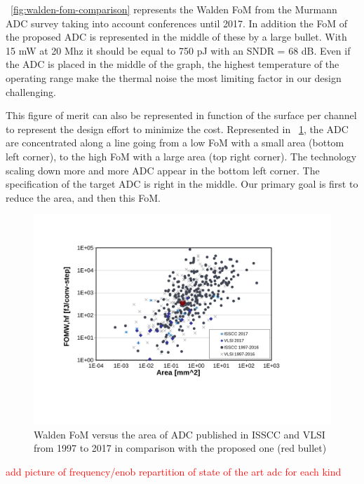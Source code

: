 \figurename~\ref{fig:walden-fom-comparison} represents the Walden FoM from the Murmann ADC survey taking into account conferences until 2017. In addition the FoM of the proposed ADC is represented in the middle of these by a large bullet. With 15 mW at 20 Mhz it should be equal to 750 pJ with an SNDR = 68 dB. Even if the ADC is placed in the middle of the graph, the highest temperature of the operating range make the thermal noise the most limiting factor in our design challenging.

This figure of merit can also be represented in function of the surface per channel to represent the design effort to minimize the cost. Represented in \figurename~\ref{fig:walden-area-fom-comparison}, the ADC are concentrated along a line going from a low FoM with a small area (bottom left corner), to the high FoM with a large area (top right corner). The technology scaling down more and more ADC appear in the bottom left corner. The specification of the target ADC is right in the middle. Our primary goal is first to reduce the area, and then this FoM.

\begin{figure}[htp]
    \centering
    \includegraphics[trim={2cm 3.5cm 3.5cm 2.5cm},clip,width=.8\textwidth]{Chapter1/Figs/walden-area.pdf}
    \caption{Walden FoM versus the area of ADC published in ISSCC and VLSI from 1997 to 2017 in comparison with the proposed one (red bullet)}
    \label{fig:walden-area-fom-comparison}
\end{figure}

\textcolor{red}{add picture of frequency/enob repartition of state of the art adc for each kind}